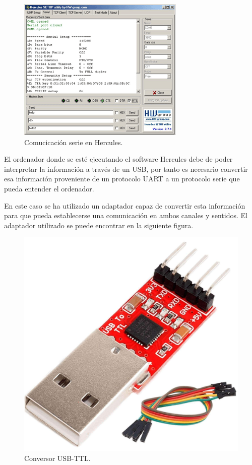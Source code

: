 \begin{figure}[h]
    \centering
    \includegraphics[scale=1.5]{fig/serial1.png}
    \caption{Comucicación serie en Hercules.}
    \label{fig:mesh1}
\end{figure}

El ordenador donde se esté ejecutando el software Hercules debe de poder interpretar la información a través de un USB, por tanto es necesario convertir esa información proveniente de un protocolo UART a un protocolo serie que pueda entender el ordenador.

En este caso se ha utilizado un adaptador capaz de convertir esta información para que pueda establecerse una comunicación en ambos canales y sentidos. El adaptador utilizado se puede encontrar en la siguiente figura.

\begin{figure}[h]
    \centering
    \includegraphics[scale=0.1]{fig/usb_ttl.jpg}
    \caption{Conversor USB-TTL.}
    \label{fig:mesh1}
\end{figure}


